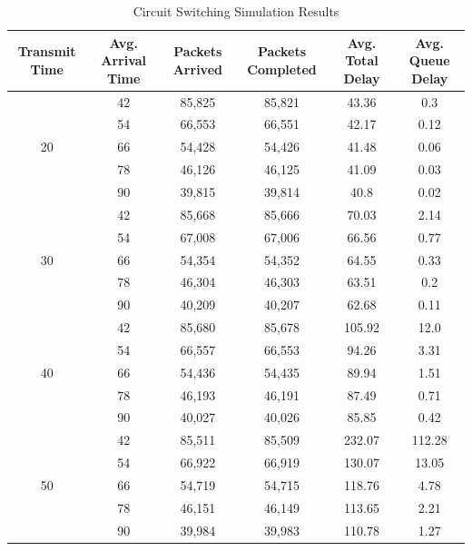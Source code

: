 \documentclass{article}
\begin{document}
  \begin{table}[h!]
    \caption{Circuit Switching Simulation Results}
    \centering
    {\footnotesize
      \begin{tabular}{|c|c|c|c|c|c|}
        \hline
        Transmit Time & Avg. Arrival Time & Packets Arrived & Packets Completed & Avg. Total Delay
        & Avg. Queue Delay\\  
        \hline

        \multirow{5}{*}{20} & 42 & 85,825 & 85,821 & 43.36 & 0.3\\
        \cline{2-6}
        & 54 & 66,553 & 66,551 & 42.17 & 0.12\\
        \cline{2-6}
        & 66 & 54,428 & 54,426 & 41.48 & 0.06\\
        \cline{2-6}
        & 78 & 46,126 & 46,125 & 41.09 & 0.03\\
        \cline{2-6}
        & 90 & 39,815 & 39,814 & 40.8 & 0.02\\
        \hline

        \multirow{5}{*}{30} & 42 & 85,668 & 85,666 & 70.03 & 2.14\\
        \cline{2-6}
        & 54 & 67,008 & 67,006 & 66.56 & 0.77\\
        \cline{2-6}
        & 66 & 54,354 & 54,352 & 64.55 & 0.33\\
        \cline{2-6}
        & 78 & 46,304 & 46,303 & 63.51 & 0.2\\
        \cline{2-6}
        & 90 & 40,209 & 40,207 & 62.68 & 0.11\\
        \hline

        \multirow{5}{*}{40} & 42 & 85,680 & 85,678 & 105.92 & 12.0\\
        \cline{2-6}
        & 54 & 66,557 & 66,553 & 94.26 & 3.31\\
        \cline{2-6}
        & 66 & 54,436 & 54,435 & 89.94 & 1.51\\
        \cline{2-6}
        & 78 & 46,193 & 46,191 & 87.49 & 0.71\\
        \cline{2-6}
        & 90 & 40,027 & 40,026 & 85.85 & 0.42\\
        \hline

        \multirow{5}{*}{50} & 42 & 85,511 & 85,509 & 232.07 & 112.28\\
        \cline{2-6}
        & 54 & 66,922 & 66,919 & 130.07 & 13.05\\
        \cline{2-6}
        & 66 & 54,719 & 54,715 & 118.76 & 4.78\\
        \cline{2-6}
        & 78 & 46,151 & 46,149 & 113.65 & 2.21\\
        \cline{2-6}
        & 90 & 39,984 & 39,983 & 110.78 & 1.27\\
        \hline
      \end{tabular}
    }
  \end{table}
\end{document}
